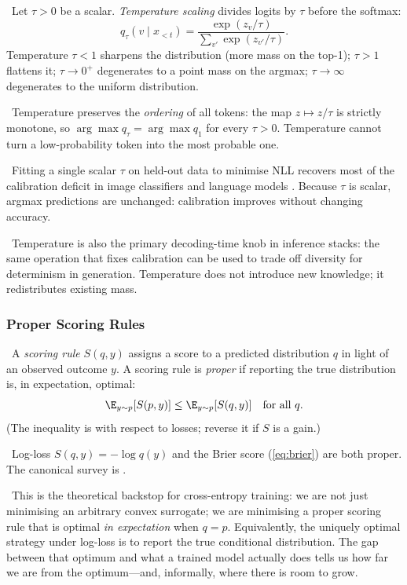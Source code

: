 \Def\ Let $\tau > 0$ be a scalar. \emph{Temperature scaling} divides
logits by $\tau$ before the softmax:
\begin{equation}
q_\tau(v \mid x_{<t}) = \frac{\exp(z_v / \tau)}{\sum_{v'} \exp(z_{v'} / \tau)}.
\label{eq:temperature}
\end{equation}
Temperature $\tau < 1$ sharpens the distribution (more mass on the
top-1); $\tau > 1$ flattens it; $\tau \to 0^+$ degenerates to a point
mass on the argmax; $\tau \to \infty$ degenerates to the uniform
distribution.

\Ident\ Temperature preserves the \emph{ordering} of all tokens: the
map $z \mapsto z/\tau$ is strictly monotone, so
$\arg\max q_\tau = \arg\max q_1$ for every $\tau > 0$. Temperature
cannot turn a low-probability token into the most probable one.

\Emp\ Fitting a single scalar $\tau$ on held-out data to minimise NLL
recovers most of the calibration deficit in image classifiers and
language models \citep{guo2017calibration}. Because $\tau$ is scalar,
argmax predictions are unchanged: calibration improves without
changing accuracy.

\Cons\ Temperature is also the primary decoding-time knob in
inference stacks: the same operation that fixes calibration can be
used to trade off diversity for determinism in generation. Temperature
does not introduce new knowledge; it redistributes existing mass.

\subsubsection{Proper Scoring Rules}

\Def\ A \emph{scoring rule} $S(q, y)$ assigns a score to a predicted
distribution $q$ in light of an observed outcome $y$. A scoring rule is
\emph{proper} if reporting the true distribution is, in expectation,
optimal:
\begin{equation}
\E_{y \sim p}[S(p, y)] \le \E_{y \sim p}[S(q, y)] \quad \text{for all } q.
\end{equation}
(The inequality is with respect to losses; reverse it if $S$ is a
gain.)

\Ident\ Log-loss $S(q, y) = -\log q(y)$ and the Brier score
(\ref{eq:brier}) are both proper. The canonical survey is
\citet{gneiting2007strictly}.

\Cons\ This is the theoretical backstop for cross-entropy training:
we are not just minimising an arbitrary convex surrogate; we are
minimising a proper scoring rule that is optimal \emph{in expectation}
when $q = p$. Equivalently, the uniquely optimal strategy under
log-loss is to report the true conditional distribution. The gap
between that optimum and what a trained model actually does tells us
how far we are from the optimum---and, informally, where there is room
to grow.

